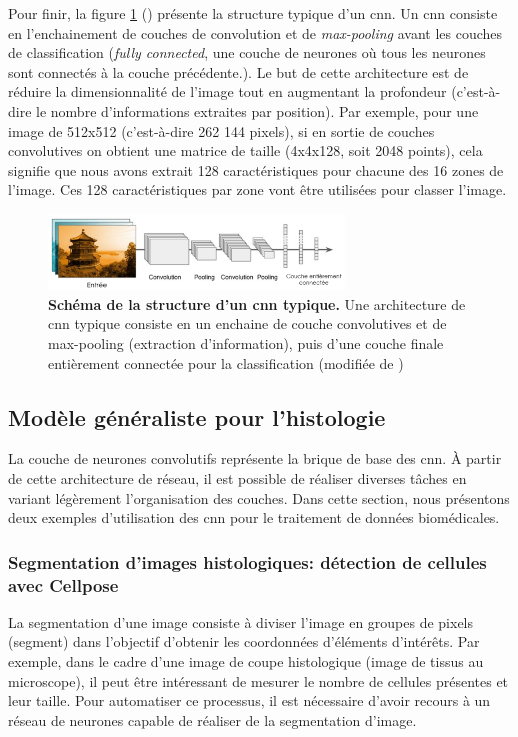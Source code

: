 Pour finir, la figure \ref{fig:cnn_archi} (\cite{aurelien_geron_hands-machine_2019}) présente la structure typique d'un \gls{cnn}. Un \gls{cnn} consiste en l'enchainement de couches de convolution et de \textit{max-pooling} avant les couches de classification (\textit{fully connected}, une couche de neurones où tous les neurones sont connectés à la couche précédente.). Le but de cette architecture est de réduire la dimensionnalité de l'image tout en augmentant la profondeur (c'est-à-dire le nombre d'informations extraites par position). Par exemple, pour une image de 512x512 (c'est-à-dire 262 144 pixels), si en sortie de couches convolutives on obtient une matrice de taille (4x4x128, soit 2048 points), cela signifie que nous avons extrait 128 caractéristiques pour chacune des 16 zones de l'image. Ces 128 caractéristiques par zone vont être utilisées pour classer l'image.
\begin{figure}[!htbp]
 \centering
 \includegraphics[width=0.7\textwidth]{figures/cnn_simple.png}
 \caption[Schéma de la structure d'un \gls{cnn} typique]{\textbf{Schéma de la structure d'un \gls{cnn} typique. } Une architecture de \gls{cnn} typique consiste en un enchaine de couche convolutives et de max-pooling (extraction d'information), puis d'une couche finale entièrement connectée pour la classification (modifiée de \cite{aurelien_geron_hands-machine_2019})}
 \label{fig:cnn_archi}
\end{figure}
\subsection{Modèle généraliste pour l'histologie}
La couche de neurones convolutifs représente la brique de base des \gls{cnn}. À partir de cette architecture de réseau, il est possible de réaliser diverses tâches en variant légèrement l'organisation des couches. Dans cette section, nous présentons deux exemples d'utilisation des \gls{cnn} pour le traitement de données biomédicales.

\subsubsection{Segmentation d'images histologiques: détection de cellules avec Cellpose}
La segmentation d'une image consiste à diviser l'image en groupes de pixels (segment) dans l'objectif d'obtenir les coordonnées d'éléments d'intérêts. Par exemple, dans le cadre d'une image de coupe histologique (image de tissus au microscope), il peut être intéressant de mesurer le nombre de cellules présentes et leur taille. Pour automatiser ce processus, il est nécessaire d'avoir recours à un réseau de neurones capable de réaliser de la segmentation d'image.


